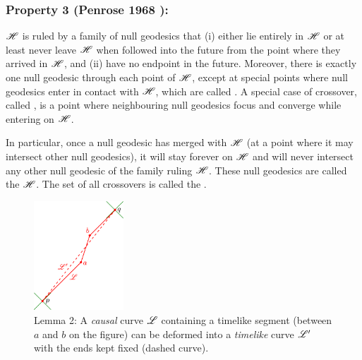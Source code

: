 \subsubsection{Property 3 (Penrose 1968 \cite{Penro68}):}
\begin{greybox}
$\mathscr{H}$ is ruled by a family of null geodesics that (i) either lie entirely
in $\mathscr{H}$ or at least never leave $\mathscr{H}$ when followed into the future from the
point where they arrived in $\mathscr{H}$, and
(ii) have no endpoint in the future.
Moreover, there is exactly one null geodesic through each point of $\mathscr{H}$,
except at special points where null geodesics enter in contact with $\mathscr{H}$, which are
called . A special case
of crossover, called , is a point
where neighbouring null geodesics focus and converge while entering on $\mathscr{H}$.
\end{greybox}
In particular, once a null geodesic has
merged with $\mathscr{H}$ (at a point where it may intersect other null geodesics),
it will stay forever on $\mathscr{H}$ and will never intersect any other null geodesic
of the family ruling $\mathscr{H}$. These null geodesics are called the
 $\mathscr{H}$.
The set of all crossovers is called the 
\cite{Siino98a,Siino98b,Brill14}.

\begin{figure}
\centerline{\includegraphics[width=0.3\textwidth]{glo_timelike_arc.pdf}}
\caption[]{\label{f:glo:timelike_arc} \footnotesize
Lemma 2: A \emph{causal} curve $\mathscr{L}$ containing a timelike segment (between
$a$ and $b$ on the figure) can be deformed into a \emph{timelike} curve $\mathscr{L}'$
with the ends kept fixed (dashed curve).}
\end{figure}



